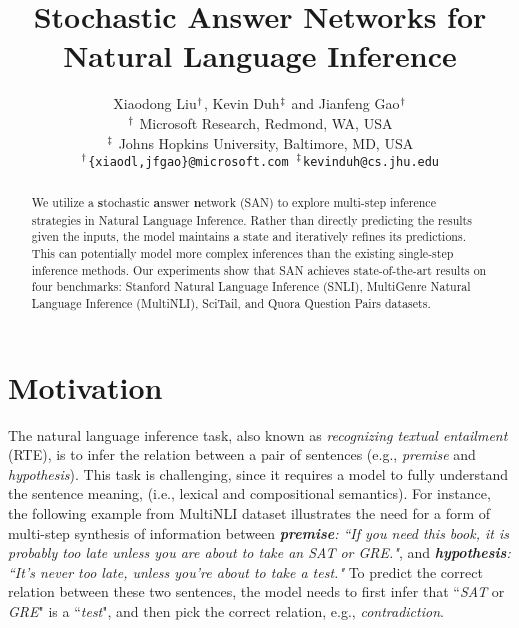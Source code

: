 \documentclass[11pt,a4paper]{article}
\title{Stochastic Answer Networks for Natural Language Inference}
\author{Xiaodong Liu$^\bold{\dagger}$, Kevin Duh$^\bold{\ddagger}$ and Jianfeng Gao$^\bold{\dagger}$ \\
  $^\bold{\dagger}$    
  Microsoft Research, Redmond, WA, USA \\
  $^\bold{\ddagger}$
  Johns Hopkins University, Baltimore, MD, USA \\
  {\tt $^\bold{\dagger}$\{xiaodl,jfgao\}@microsoft.com
   $^\bold{\ddagger}$kevinduh@cs.jhu.edu}
}
\date{}
\begin{document}
\maketitle
\begin{abstract}
We utilize a \textbf{s}tochastic \textbf{a}nswer \textbf{n}etwork (SAN) to explore multi-step inference strategies in Natural Language Inference. Rather than directly predicting the results given the inputs, the model maintains a state and iteratively refines its predictions. This can potentially model more complex inferences than the existing single-step inference methods.
Our experiments show that SAN achieves state-of-the-art results on four benchmarks: Stanford Natural Language Inference (SNLI), MultiGenre Natural Language Inference (MultiNLI), SciTail, and Quora Question Pairs datasets.
\end{abstract}
\section{Motivation}
\label{sec:mot}
The natural language inference task, also known as \textit{recognizing textual entailment} (RTE), is to infer the relation between a pair of sentences (e.g., \textit{premise} and \textit{hypothesis}).
This task is challenging, since it requires a model to fully understand the sentence meaning, (i.e., lexical and compositional semantics). For instance, the following example from MultiNLI dataset \cite{2017arXiv170405426W} illustrates the need for a form of multi-step synthesis of information between \textit{\textbf{premise}: ``If you need this book, it is probably too late unless you are about to take an SAT or GRE."}, and \textit{\textbf{hypothesis}: ``It's never too late, unless you're about to take a test."} To predict the correct relation between these two sentences, the model needs to first infer that ``\textit{SAT} or \textit{GRE}" is a ``\textit{test}", and then pick the correct relation, e.g., \textit{contradiction}. 
\end{document}
